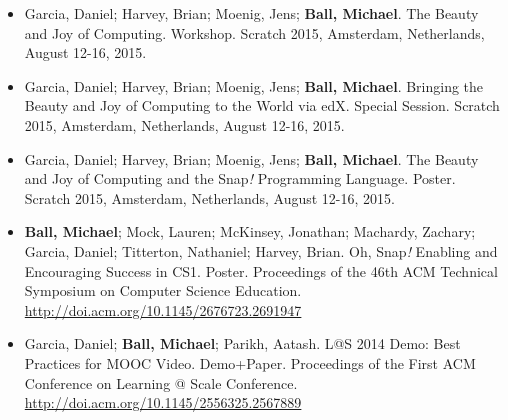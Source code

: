 \begin{itemize}

    \item{Garcia, Daniel; Harvey, Brian; Moenig, Jens; \textbf{Ball, Michael}. The Beauty and Joy of Computing. Workshop. Scratch 2015, Amsterdam, Netherlands, August 12-16, 2015.}

    \item{Garcia, Daniel; Harvey, Brian; Moenig, Jens; \textbf{Ball, Michael}. Bringing the Beauty and Joy of Computing to the World via edX. Special Session. Scratch 2015, Amsterdam, Netherlands, August 12-16, 2015.}

    \item{Garcia, Daniel; Harvey, Brian; Moenig, Jens; \textbf{Ball, Michael}. The Beauty and Joy of Computing and the Snap\textit{!} Programming Language. Poster. Scratch 2015, Amsterdam, Netherlands, August 12-16, 2015.}

    \item{\textbf{Ball, Michael}; Mock, Lauren; McKinsey, Jonathan; Machardy, Zachary; Garcia, Daniel; Titterton, Nathaniel; Harvey, Brian. Oh, Snap\textit{!} Enabling and Encouraging Success in CS1. Poster. Proceedings of the 46th ACM Technical Symposium on Computer Science Education.} \newline\href{http://doi.acm.org/10.1145/2676723.2691947}{http://doi.acm.org/10.1145/2676723.2691947}
    

    \item{Garcia, Daniel; \textbf{Ball, Michael}; Parikh, Aatash. L@S 2014 Demo: Best Practices for MOOC Video. Demo+Paper. Proceedings of the First ACM Conference on Learning @ Scale Conference.} \href{http://doi.acm.org/10.1145/2556325.2567889}{http://doi.acm.org/10.1145/2556325.2567889}

\end{itemize}
